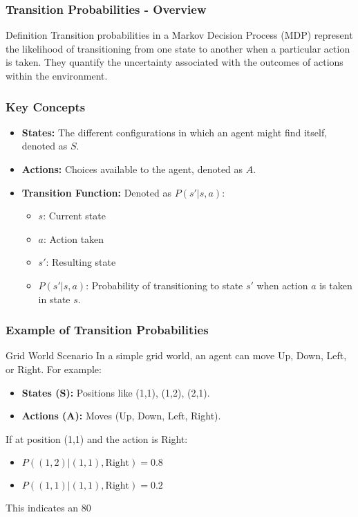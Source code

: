 \documentclass[aspectratio=169]{beamer}
\begin{document}
\begin{frame}[fragile]
    \frametitle{Transition Probabilities - Overview}
    \begin{block}{Definition}
        Transition probabilities in a Markov Decision Process (MDP) represent the likelihood of transitioning from one state to another when a particular action is taken. They quantify the uncertainty associated with the outcomes of actions within the environment.
    \end{block}
\end{frame}

\begin{frame}[fragile]
    \frametitle{Key Concepts}
    \begin{itemize}
        \item \textbf{States:} The different configurations in which an agent might find itself, denoted as \( S \).
        \item \textbf{Actions:} Choices available to the agent, denoted as \( A \).
        \item \textbf{Transition Function:} Denoted as \( P(s' | s, a) \):
        \begin{itemize}
            \item \( s \): Current state
            \item \( a \): Action taken
            \item \( s' \): Resulting state
            \item \( P(s' | s, a) \): Probability of transitioning to state \( s' \) when action \( a \) is taken in state \( s \).
        \end{itemize}
    \end{itemize}
\end{frame}

\begin{frame}[fragile]
    \frametitle{Example of Transition Probabilities}
    \begin{block}{Grid World Scenario}
        In a simple grid world, an agent can move Up, Down, Left, or Right. For example:
        \begin{itemize}
            \item \textbf{States (S):} Positions like (1,1), (1,2), (2,1).
            \item \textbf{Actions (A):} Moves (Up, Down, Left, Right).
        \end{itemize}
        If at position (1,1) and the action is Right:
        \begin{itemize}
            \item \( P((1, 2) | (1, 1), \text{Right}) = 0.8 \)
            \item \( P((1, 1) | (1, 1), \text{Right}) = 0.2 \)
        \end{itemize}
        This indicates an 80%
    \end{block}
\end{frame}
\end{document}
